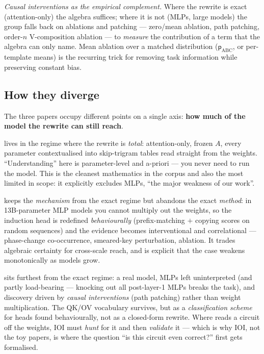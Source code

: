 \emph{Causal interventions as the empirical complement.} Where the rewrite is exact (attention-only) the algebra suffices; where it is not (MLPs, large models) the group falls back on ablations and patching --- zero/mean ablation, path patching, order-$n$ V-composition ablation --- to \emph{measure} the contribution of a term that the algebra can only name. Mean ablation over a matched distribution ($\mathsf{p}_{\mathrm{ABC}}$, or per-template means) is the recurring trick for removing task information while preserving constant bias.

\subsection*{How they diverge}

The three papers occupy different points on a single axis: \textbf{how much of the model the rewrite can still reach}.

\textcite{framework} lives in the regime where the rewrite is \emph{total}: attention-only, frozen $A$, every parameter contextualised into skip-trigram tables read straight from the weights. ``Understanding'' here is parameter-level and a-priori --- you never need to run the model. This is the cleanest mathematics in the corpus and also the most limited in scope: it explicitly excludes MLPs, ``the major weakness of our work''.

\textcite{induction-heads} keeps the \emph{mechanism} from the exact regime but abandons the exact \emph{method}: in 13B-parameter MLP models you cannot multiply out the weights, so the induction head is redefined \emph{behaviourally} (prefix-matching $+$ copying scores on random sequences) and the evidence becomes interventional and correlational --- phase-change co-occurrence, smeared-key perturbation, ablation. It trades algebraic certainty for cross-scale reach, and is explicit that the case weakens monotonically as models grow.

\textcite{interpretability-in-the-wild-ioi} sits furthest from the exact regime: a real model, MLPs left uninterpreted (and partly load-bearing --- knocking out all post-layer-1 MLPs breaks the task), and discovery driven by \emph{causal interventions} (path patching) rather than weight multiplication. The QK/OV vocabulary survives, but as a \emph{classification scheme} for heads found behaviourally, not as a closed-form rewrite. Where \textcite{framework} reads a circuit off the weights, IOI must \emph{hunt} for it and then \emph{validate} it --- which is why IOI, not the toy papers, is where the question ``is this circuit even correct?'' first gets formalised.

